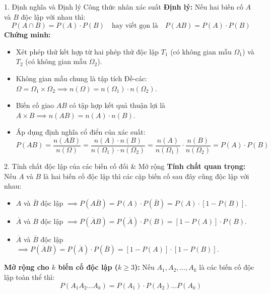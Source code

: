 \documentclass[12pt, a4paper]{article}
\begin{document}
\begin{pedabox}{1. Định nghĩa và Định lý Công thức nhân xác suất}
\textbf{Định lý:} Nếu hai biến cố $A$ và $B$ độc lập với nhau thì:
\begin{equation}
    P(A \cap B) = P(A) \cdot P(B) \quad \text{hay viết gọn là} \quad P(AB) = P(A) \cdot P(B)
\end{equation}
\textbf{Chứng minh:}
\begin{itemize}[leftmargin=0.5cm]
    \item Xét phép thử kết hợp từ hai phép thử độc lập $T_1$ (có không gian mẫu $\Omega_1$) và $T_2$ (có không gian mẫu $\Omega_2$).
    \item Không gian mẫu chung là tập tích Đề-các: $\Omega = \Omega_1 \times \Omega_2 \implies n(\Omega) = n(\Omega_1) \cdot n(\Omega_2)$.
    \item Biến cố giao $AB$ có tập hợp kết quả thuận lợi là $A \times B \implies n(AB) = n(A) \cdot n(B)$.
    \item Áp dụng định nghĩa cổ điển của xác suất:
    $$P(AB) = \dfrac{n(AB)}{n(\Omega)} = \dfrac{n(A) \cdot n(B)}{n(\Omega_1) \cdot n(\Omega_2)} = \dfrac{n(A)}{n(\Omega_1)} \cdot \dfrac{n(B)}{n(\Omega_2)} = P(A) \cdot P(B)$$
\end{itemize}
\end{pedabox}

\begin{pedabox}{2. Tính chất độc lập của các biến cố đối \& Mở rộng}
\textbf{Tính chất quan trọng:} Nếu $A$ và $B$ là hai biến cố độc lập thì các cặp biến cố sau đây cũng độc lập với nhau:
\begin{itemize}[leftmargin=0.5cm]
    \item $A$ và $\overline{B}$ độc lập $\implies P(A\overline{B}) = P(A) \cdot P(\overline{B}) = P(A) \cdot [1 - P(B)]$.
    \item $\overline{A}$ và $B$ độc lập $\implies P(\overline{A}B) = P(\overline{A}) \cdot P(B) = [1 - P(A)] \cdot P(B)$.
    \item $\overline{A}$ và $\overline{B}$ độc lập $\implies P(\overline{A}\overline{B}) = P(\overline{A}) \cdot P(\overline{B}) = [1 - P(A)] \cdot [1 - P(B)]$.
\end{itemize}
\textbf{Mở rộng cho $k$ biến cố độc lập ($k \geq 3$):}
Nếu $A_1, A_2, \dots, A_k$ là các biến cố độc lập toàn thể thì:
\begin{equation}
    P(A_1 A_2 \dots A_k) = P(A_1) \cdot P(A_2) \dots P(A_k)
\end{equation}
\end{pedabox}
\end{document}
